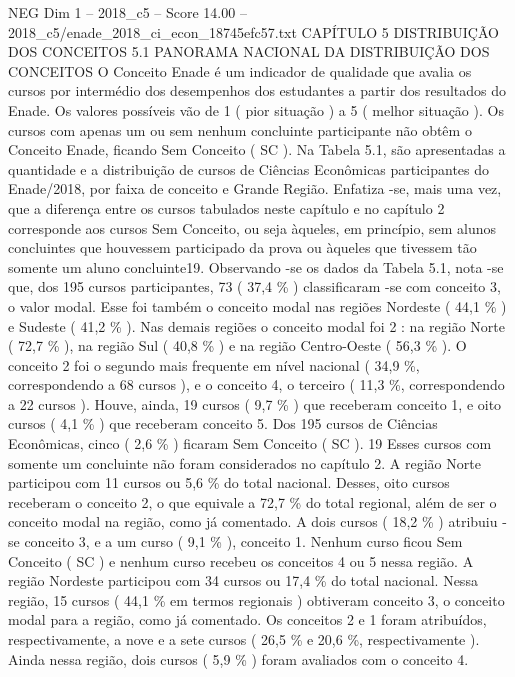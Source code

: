 \begin{textsample}{NEG Dim 1 – 2018\_c5 – Score 14.00 – 2018\_c5/enade\_2018\_ci\_econ\_18745efc57.txt}  \label{ex:f1_neg_379}
CAPÍTULO 5 DISTRIBUIÇÃO DOS CONCEITOS 5.1 PANORAMA NACIONAL DA DISTRIBUIÇÃO DOS CONCEITOS O Conceito Enade é um indicador de qualidade que avalia os cursos por intermédio dos desempenhos dos estudantes a partir dos resultados do Enade.
Os valores possíveis vão de 1 ( pior situação ) a 5 ( melhor situação ).
Os cursos com apenas um ou sem nenhum concluinte participante não obtêm o Conceito Enade, ficando Sem Conceito ( SC ).
Na Tabela 5.1, são apresentadas a quantidade e a distribuição de cursos de Ciências Econômicas participantes do Enade/2018, por faixa de conceito e Grande Região.
Enfatiza -se, mais uma vez, que a diferença entre os cursos tabulados neste capítulo e no capítulo 2 corresponde aos cursos Sem Conceito, ou seja àqueles, em princípio, sem alunos concluintes que houvessem participado da prova ou àqueles que tivessem tão somente um aluno concluinte19.
Observando -se os dados da Tabela 5.1, nota -se que, dos 195 cursos participantes, 73 ( 37,4 \% ) classificaram -se com conceito 3, o valor modal.
Esse foi também o conceito modal nas regiões Nordeste ( 44,1 \% ) e Sudeste ( 41,2 \% ).
Nas demais regiões o conceito modal foi 2 : na região Norte ( 72,7 \% ), na região Sul ( 40,8 \% ) e na região Centro-Oeste ( 56,3 \% ).
O conceito 2 foi o segundo mais frequente em nível nacional ( 34,9 \%, correspondendo a 68 cursos ), e o conceito 4, o terceiro ( 11,3 \%, correspondendo a 22 cursos ).
Houve, ainda, 19 cursos ( 9,7 \% ) que receberam conceito 1, e oito cursos ( 4,1 \% ) que receberam conceito 5.
Dos 195 cursos de Ciências Econômicas, cinco ( 2,6 \% ) ficaram Sem Conceito ( SC ). 19 Esses cursos com somente um concluinte não foram considerados no capítulo 2.
A região Norte participou com 11 cursos ou 5,6 \% do total nacional.
Desses, oito cursos receberam o conceito 2, o que equivale a 72,7 \% do total regional, além de ser o conceito modal na região, como já comentado.
A dois cursos ( 18,2 \% ) atribuiu -se conceito 3, e a um curso ( 9,1 \% ), conceito 1.
Nenhum curso ficou Sem Conceito ( SC ) e nenhum curso recebeu os conceitos 4 ou 5 nessa região.
A região Nordeste participou com 34 cursos ou 17,4 \% do total nacional.
Nessa região, 15 cursos ( 44,1 \% em termos regionais ) obtiveram conceito 3, o conceito modal para a região, como já comentado.
Os conceitos 2 e 1 foram atribuídos, respectivamente, a nove e a sete cursos ( 26,5 \% e 20,6 \%, respectivamente ).
Ainda nessa região, dois cursos ( 5,9 \% ) foram avaliados com o conceito 4.

\end{textsample}
